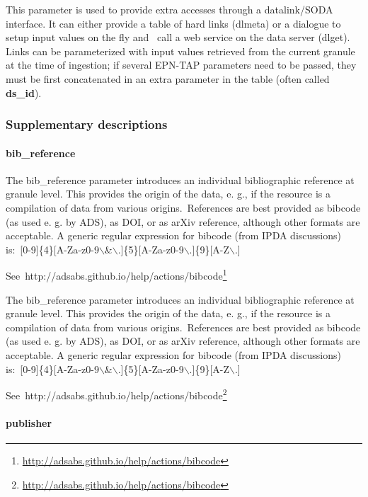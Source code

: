 \documentclass[11pt,a4paper]{ivoa}
\begin{document}
This parameter is used to provide extra accesses through a datalink/SODA interface. It can either provide a table of hard links (dlmeta) or a dialogue to setup input values on the fly and  call a web service on the data server (dlget). Links can be parameterized with input values retrieved from the current granule at the time of ingestion; if several EPN-TAP parameters need to be passed, they must be first concatenated in an extra parameter in the table (often called \textbf{ds\_id}).

\subsubsection{Supplementary descriptions\\}

\paragraph{bib\_reference}

The bib\_reference parameter introduces an individual bibliographic reference at granule level. This provides the origin of the data, e. g., if the resource is a compilation of data from various origins. References are best provided as bibcode (as used e. g. by ADS), as DOI, or as arXiv reference, although other formats are acceptable. A generic regular expression for bibcode (from IPDA discussions) is: [0-9]\{4\}[A-Za-z0-9$\backslash$\&$\backslash$.]\{5\}[A-Za-z0-9$\backslash$.]\{9\}[A-Z$\backslash$.] 

See http://adsabs.github.io/help/actions/bibcode\footnote{\url{http://adsabs.github.io/help/actions/bibcode}}

The bib\_reference parameter introduces an individual bibliographic reference at granule level. This provides the origin of the data, e. g., if the resource is a compilation of data from various origins. References are best provided as bibcode (as used e. g. by ADS), as DOI, or as arXiv reference, although other formats are acceptable. A generic regular expression for bibcode (from IPDA discussions) is: [0-9]\{4\}[A-Za-z0-9$\backslash$\&$\backslash$.]\{5\}[A-Za-z0-9$\backslash$.]\{9\}[A-Z$\backslash$.] 

See http://adsabs.github.io/help/actions/bibcode\footnote{\url{http://adsabs.github.io/help/actions/bibcode}}

\paragraph{publisher}
\end{document}
